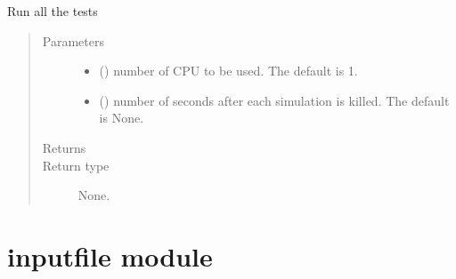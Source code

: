 \documentclass[letterpaper,10pt,english]{sphinxmanual}
\begin{document}
\begin{fulllineitems}
\begin{fulllineitems}
\begin{quote}
\begin{description}
\end{description}\end{quote}

\end{fulllineitems}


\begin{fulllineitems}
\label{\detokenize{api/inputgeneration:testrun.MultipleTest.run}}
\sphinxAtStartPar
Run all the tests
\begin{quote}\begin{description}
\item[{Parameters}] \leavevmode\begin{itemize}
\item {} 
\sphinxAtStartPar
{} (\sphinxstyleliteralemphasis{\sphinxupquote{, }}) \textendash{} number of CPU to be used. The default is 1.

\item {} 
\sphinxAtStartPar
{} (\sphinxstyleliteralemphasis{\sphinxupquote{, }}) \textendash{} number of seconds after each simulation is killed. The default is
None.

\end{itemize}

\item[{Returns}] \leavevmode
\sphinxAtStartPar


\item[{Return type}] \leavevmode
\sphinxAtStartPar
None.

\end{description}\end{quote}

\end{fulllineitems}


\end{fulllineitems}



\section{inputfile module}
\label{\detokenize{api/inputgeneration:inputfile-module}}
\end{document}
